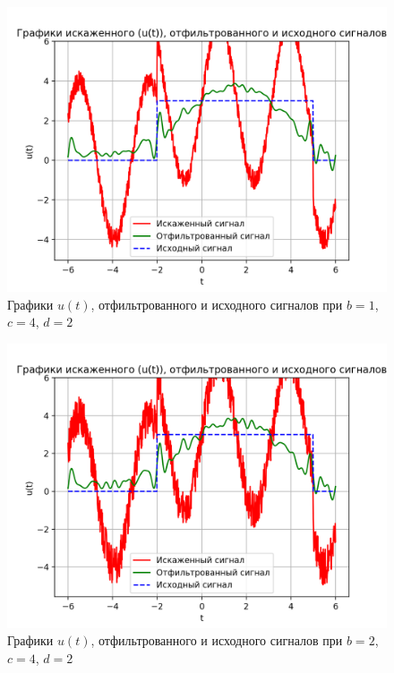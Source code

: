 \begin{figure}[ht!]
    \centering
    \includegraphics[scale=0.85]{media/1 task/specific_freq/Cleaned_1_4_2_-0,8:-0,153.png}
    \caption{Графики  $u(t)$, отфильтрованного и исходного сигналов при $b=1$,  $c=4$,  $d=2$}
    \label{fig:cleaned_1_4_2}
\end{figure}

\begin{figure}[ht!]
    \centering
    \includegraphics[scale=0.85]{media/1 task/specific_freq/Cleaned_2_4_2_-0,8:-0,153.png}
    \caption{Графики  $u(t)$, отфильтрованного и исходного сигналов при $b=2$,  $c=4$,  $d=2$}
    \label{fig:cleaned_2_4_2}
\end{figure}

